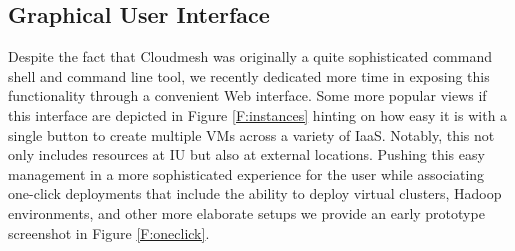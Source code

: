 \documentclass{tex/sig-alternate-2013}
\begin{document}
\subsection{Graphical User Interface}

Despite the fact that Cloudmesh was originally a quite sophisticated
command shell and command line tool, we recently dedicated more time
in exposing this functionality through a convenient Web
interface. Some more popular views if this interface are depicted in
Figure \ref{F:instances} hinting on how easy it is with a single
button to create multiple VMs across a variety of IaaS. Notably, this
not only includes resources at IU but also at external
locations. Pushing this easy management in a more sophisticated
experience for the user while associating one-click deployments that
include the ability to deploy virtual clusters, Hadoop environments,
and other more elaborate setups we provide an early prototype
screenshot in Figure \ref{F:oneclick}.
\end{document}
